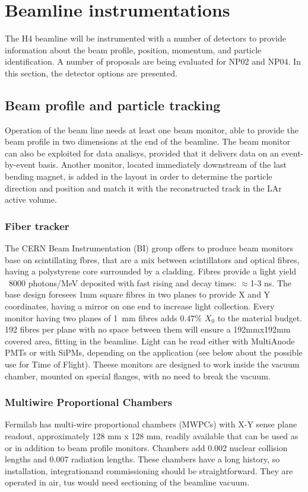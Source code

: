 \section{Beamline instrumentations}
\label{sec:beaminstruments}

The H4 beamline will be instrumented with a number of detectors to provide information about the beam profile, position, momentum, and particle identification. A number of proposals are being evaluated for NP02 and NP04. In this section, the detector options are presented. 

\subsection{Beam profile and particle tracking}
Operation of the beam line needs at least one beam  monitor, able to provide the beam profile in two dimensions at the end of the beamline.   The beam monitor can also be exploited for data analisys, provided that it delivers data on an event-by-event basis. Another monitor, located immediately downstream of the last bending magnet, is added in the layout  in order to determine the particle  direction and position and match it with the reconstructed track in the LAr active volume.
\subsubsection{Fiber tracker}
The CERN Beam Instrumentation (BI) group offers to produce beam monitors base on scintillating fbres, that  are a mix between scintillators and optical fibres, having a polystyrene core surrounded by a cladding. Fibres provide a light yield ~8000 photons/MeV deposited with fast rising and decay times: $\approx$1-3 ns. The base design foresees 1mm square fibres in two planes to provide X and Y coordinates, having a  mirror on one end to increase
light collection.  Every monitor having two planes of 1~mm fibres adds 0.47\% $X_0$ to the material budget.
192 fibres per plane with no space between them will ensure a  192mmx192mm covered area, fitting in the beamline.
Light can be read either with MultiAnode PMTs or with SiPMs, depending on the application (see below about the possible use for Time of Flight).
Theese monitors are designed to work inside the vacuum chamber, mounted on special flanges, with no need to break the vacuum.

\subsubsection{Multiwire Proportional Chambers}
Fermilab has multi-wire proportional chambers (MWPCs) with X-Y sense plane
readout, approximately 128 mm x 128 mm, readily available that can be used as or in addition to beam profile monitors. Chambers add 0.002 nuclear collision lengths and 0.007
radiation lengths. These chambers have a long history, so installation, integrationand commissioning should be straightforward. They are operated in air, tus would need sectioning of the beamline vacuum.

